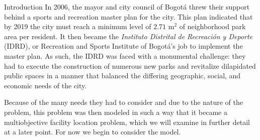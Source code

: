 \documentclass[12pt]{pom_thesis}
\begin{document}
\begin{chapter}{Introduction}
	In 2006, the mayor and city council of Bogot\'{a} threw their support behind a sports and recreation master plan for the city. This plan indicated that by 2019 the city must reach a minimum level of $2.71$  $\textrm{m}^2$ of neighborhood park area per resident. It then became the \textit{Instituto Distrital de Recreaci\'{o}n y Deporte} (IDRD), or Recreation and Sports Institute of Bogot\'{a}'s job to implement the master plan. As such, the IDRD was faced with a monumental challenge: they had to execute the construction of numerous new parks and revitalize dilapidated public spaces in a manner that balanced the differing geographic, social, and economic needs of the city. 
	
	Because of the many needs they had to consider and due to the nature of the problem, this problem was then modeled in such a way that it became a multiobjective facility location problem, which we will examine in further detail at a later point. For now we begin to consider the model.
\end{chapter}
\end{document}
